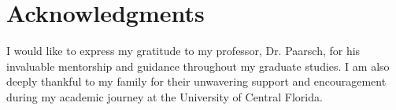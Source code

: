 \section*{Acknowledgments}

I would like to express my gratitude to my professor, Dr. Paarsch, for his invaluable mentorship and guidance throughout my graduate studies. I am also deeply thankful to my family for their unwavering support and encouragement during my academic journey at the University of Central Florida.

\newpage
